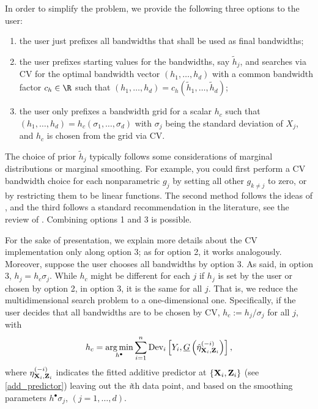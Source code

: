 In order to simplify the problem, we provide the following three options to the user: 
\begin{enumerate} 
 \item  the user just prefixes all bandwidths that shall be used as final bandwidths;
 \item  the user prefixes starting values for the bandwidths, say $\tilde h_j$, and searches  
via CV for the optimal bandwidth vector $(h_1,\ldots ,h_d)$ with a common bandwidth factor 
$c_h\in\R$ such that $(h_1,\ldots ,h_d)=c_h (\tilde h_1,\ldots ,\tilde h_d)$;
 \item  the user only prefixes a bandwidth grid for a scalar $h_c$ such that  
 $(h_1,\ldots ,h_d)=h_c (\sigma_1,\ldots ,\sigma_d)$  with $\sigma_j$ being the standard deviation of $X_j$, and $h_c$ is chosen from the grid via CV. 
\end{enumerate} 
The choice of prior $\tilde h_j$ typically follows some considerations of marginal distributions or marginal smoothing. For example, you could first perform a CV bandwidth choice for each nonparametric $g_j$ by setting all other $g_{k\neq j}$ to zero, or by restricting them to be linear functions.
The second method follows the ideas of \cite{HP2018}, and the third follows a standard recommendation in the literature, see the review of \cite{KSS2014}. Combining options 1 and 3 is possible. 

For the sake of presentation, we explain more details about the CV implementation only along option 3; as for option 2, it works analogously. Moreover, suppose the user chooses all bandwidths by option 3.
As said, in option 3, $h_j=h_c \sigma_j$. While $h_c$ might be different for each $j$ if $h_j$ is set by the user or chosen by option 2, in option 3, it is the same for all $j$. That is, we reduce the multidimensional search problem to a one-dimensional one. Specifically, if the user decides that all bandwidths are to be chosen by CV, $h_c:= h_j/\sigma_j$ for all $j$, with 
\begin{equation}  \label{CV_2}
h_c = \underset{h^\bullet} {\operatorname{arg\min} }  
\sum_{i=1}^n \mbox{Dev}_i \left [ {Y_i, \underline{G} \left({
\hat \eta ^{(-i)}_{{\bf X}_i,{\bf Z}_i} }\right)}\right],
\end{equation}
where $\eta^{(-i)}_{{\bf X}_i,{\bf Z}_i}$ indicates the fitted additive predictor at $\left \{{{\bf X}_i,{\bf Z}_i}\right\}$ (see \eqref{add_predictor}) leaving out the \textit{i}th data point, and based on the smoothing parameters $h^\bullet\sigma_j$, $(j = 1, \ldots, d)$.  

